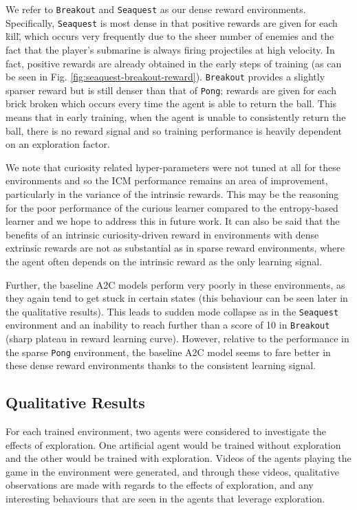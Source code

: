 \documentclass{article}
\begin{document}
We refer to \texttt{Breakout} and \texttt{Seaquest} as our dense reward environments. Specifically, \texttt{Seaquest} is most dense in that positive rewards are given for each \"kill\", which occurs very frequently due to the sheer number of enemies and the fact that the player's submarine is always firing projectiles at high velocity. In fact, positive rewards are already obtained in the early steps of training (as can be seen in Fig. \ref{fig:seaquest-breakout-reward}). \texttt{Breakout} provides a slightly sparser reward but is still denser than that of \texttt{Pong}; rewards are given for each brick broken which occurs every time the agent is able to return the ball. This means that in early training, when the agent is unable to consistently return the ball, there is no reward signal and so training performance is heavily dependent on an exploration factor.

We note that curiosity related hyper-parameters were not tuned at all for these environments and so the ICM performance remains an area of improvement, particularly in the variance of the intrinsic rewards. This may be the reasoning for the poor performance of the curious learner compared to the entropy-based learner and we hope to address this in future work. It can also be said that the benefits of an intrinsic curiosity-driven reward in environments with dense extrinsic rewards are not as substantial as in sparse reward environments, where the agent often depends on the intrinsic reward as the only learning signal.

Further, the baseline A2C models perform very poorly in these environments, as they again tend to get stuck in certain states (this behaviour can be seen later in the qualitative results). This leads to sudden mode collapse as in the \texttt{Seaquest} environment and an inability to reach further than a score of 10 in \texttt{Breakout} (sharp plateau in reward learning curve). However, relative to the performance in the sparse \texttt{Pong} environment, the baseline A2C model seems to fare better in these dense reward environments thanks to the consistent learning signal.

\subsection{Qualitative Results}
For each trained environment, two agents were considered to investigate the effects of exploration. One artificial agent would be trained without exploration and the other would be trained with exploration. Videos of the agents playing the game in the environment were generated, and through these videos, qualitative observations are made with regards to the effects of exploration, and any interesting behaviours that are seen in the agents that leverage exploration.
\end{document}
